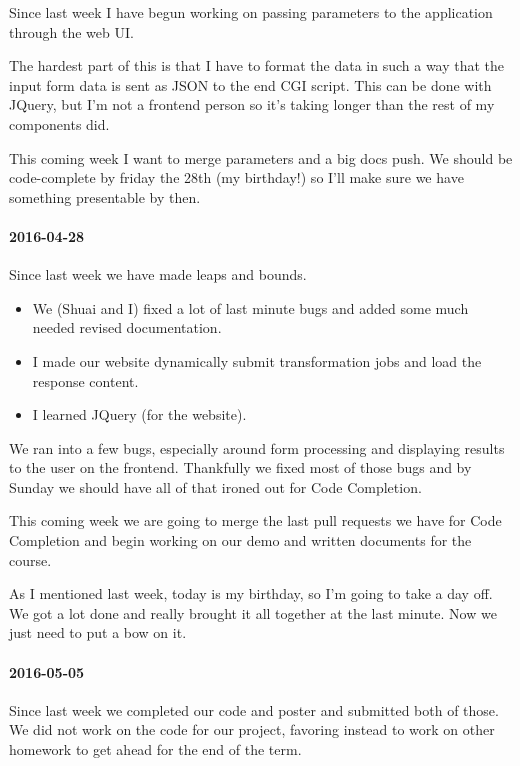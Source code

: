 Since last week I have begun working on passing parameters to the application through the web UI.

The hardest part of this is that I have to format the data in such a way that the input form data is sent as JSON to the end CGI script.
This can be done with JQuery, but I'm not a frontend person so it's taking longer than the rest of my components did.

This coming week I want to merge parameters and a big docs push.
We should be code-complete by friday the 28th (my birthday!) so I'll make sure we have something presentable by then.

\paragraph{2016-04-28}

Since last week we have made leaps and bounds.

\begin{itemize}
  \item We (Shuai and I) fixed a lot of last minute bugs and added some much needed revised documentation.
  \item I made our website dynamically submit transformation jobs and load the response content.
  \item I learned JQuery (for the website).
\end{itemize}

We ran into a few bugs, especially around form processing and displaying results to the user on the frontend.
Thankfully we fixed most of those bugs and by Sunday we should have all of that ironed out for Code Completion.

This coming week we are going to merge the last pull requests we have for Code Completion and begin working on our demo and written documents for the course.

As I mentioned last week, today is my birthday, so I'm going to take a day off.
We got a lot done and really brought it all together at the last minute.
Now we just need to put a bow on it.

\paragraph{2016-05-05}

Since last week we completed our code and poster and submitted both of those.
We did not work on the code for our project, favoring instead to work on other homework to get ahead for the end of the term.

